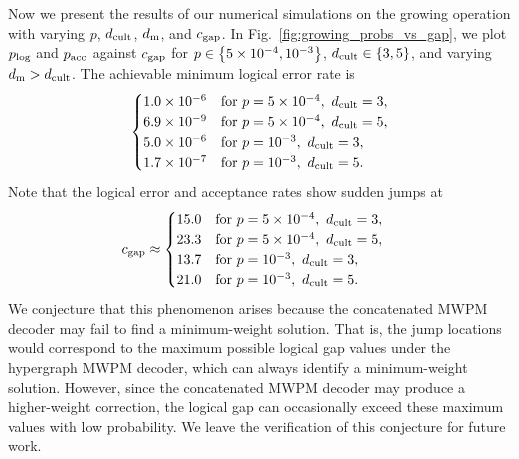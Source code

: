 \documentclass[
 prx,
 reprint,
 superscriptaddress,
 longbibliography,
 dvipsnames
]{revtex4-2}
\begin{document}
Now we present the results of our numerical simulations on the growing operation with varying $p$, $d_\mathrm{cult}$, $d_{\mathrm{m}}$, and $c_{\mathrm{gap}}$.
In Fig.~\ref{fig:growing_probs_vs_gap}, we plot $p_{\mathrm{log}}$ and $p_{\mathrm{acc}}$ against $c_{\mathrm{gap}}$ for $p \in \qty{5 \times 10^{-4}, 10^{-3}}$, $d_\mathrm{cult} \in \qty{3, 5}$, and varying $d_{\mathrm{m}} > d_\mathrm{cult}$.
The achievable minimum logical error rate is 
\begin{align*}
\begin{cases}
    1.0 \times 10^{-6} & \text{for } p = 5 \times 10^{-4},~d_\mathrm{cult} = 3, \\
    6.9 \times 10^{-9} & \text{for } p = 5 \times 10^{-4},~d_\mathrm{cult} = 5, \\
    5.0 \times 10^{-6} & \text{for } p = 10^{-3},~d_\mathrm{cult} = 3, \\
    1.7 \times 10^{-7} & \text{for } p = 10^{-3},~d_\mathrm{cult} = 5.
\end{cases}
\end{align*}
Note that the logical error and acceptance rates show sudden jumps at
\begin{align}
c_{\mathrm{gap}} &\approx
\begin{cases}
    15.0 & \text{for } p = 5 \times 10^{-4},~d_\mathrm{cult} = 3, \\
    23.3 & \text{for } p = 5 \times 10^{-4},~d_\mathrm{cult} = 5, \\
    13.7 & \text{for } p = 10^{-3},~d_\mathrm{cult} = 3, \\
    21.0 & \text{for } p = 10^{-3},~d_\mathrm{cult} = 5. \\
\end{cases}
\label{eq:cgap_sudden_jumps}
\end{align}
We conjecture that this phenomenon arises because the concatenated MWPM decoder may fail to find a minimum-weight solution. 
That is, the jump locations would correspond to the maximum possible logical gap values under the hypergraph MWPM decoder, which can always identify a minimum-weight solution.
However, since the concatenated MWPM decoder may produce a higher-weight correction, the logical gap can occasionally exceed these maximum values with low probability.
We leave the verification of this conjecture for future work.
\end{document}
